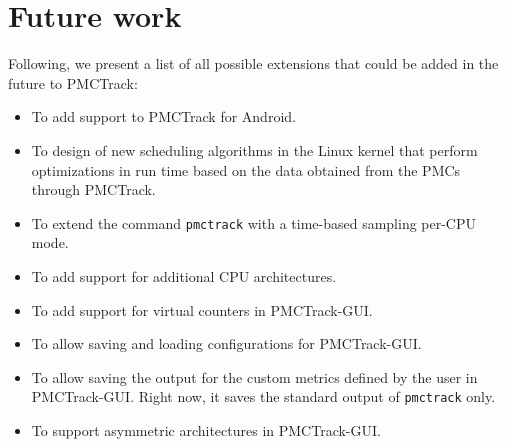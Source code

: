 \section{Future work}
Following, we present a list of all possible extensions that could be added in the future to PMCTrack:
\begin{itemize}
  \item To add support to PMCTrack for Android.
  \item To design of new scheduling algorithms in the Linux kernel that perform optimizations in run time based on the data obtained from the PMCs through PMCTrack.
  \item To extend the command \texttt{pmctrack} with a time-based sampling per-CPU mode.
  \item To add support for additional CPU architectures.
  \item To add support for virtual counters in PMCTrack-GUI.
  \item To allow saving and loading configurations for PMCTrack-GUI.
  \item To allow saving the output for the custom metrics defined by the user in PMCTrack-GUI. Right now, it saves the standard output of \texttt{pmctrack} only.
  \item To support asymmetric architectures in PMCTrack-GUI.
\end{itemize}

